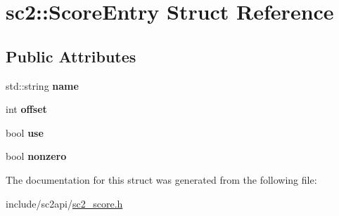 \hypertarget{structsc2_1_1_score_entry}{}\section{sc2\+:\+:Score\+Entry Struct Reference}
\label{structsc2_1_1_score_entry}
\subsection*{Public Attributes}
\begin{DoxyCompactItemize}
\item 
\mbox{\label{structsc2_1_1_score_entry_af7da48005cda508497512a3a67f2b603}} 
std\+::string {\bfseries name}
\item 
\mbox{\label{structsc2_1_1_score_entry_a6d0b76b36b9e3cc8ec80b4271e8670ad}} 
int {\bfseries offset}
\item 
\mbox{\label{structsc2_1_1_score_entry_a309550ccbfca6512390da1bc31e1cce9}} 
bool {\bfseries use}
\item 
\mbox{\label{structsc2_1_1_score_entry_afd936c62353a97b4fb04607e2a129293}} 
bool {\bfseries nonzero}
\end{DoxyCompactItemize}


The documentation for this struct was generated from the following file\+:\begin{DoxyCompactItemize}
\item 
include/sc2api/\hyperlink{sc2__score_8h}{sc2\+\_\+score.\+h}\end{DoxyCompactItemize}
